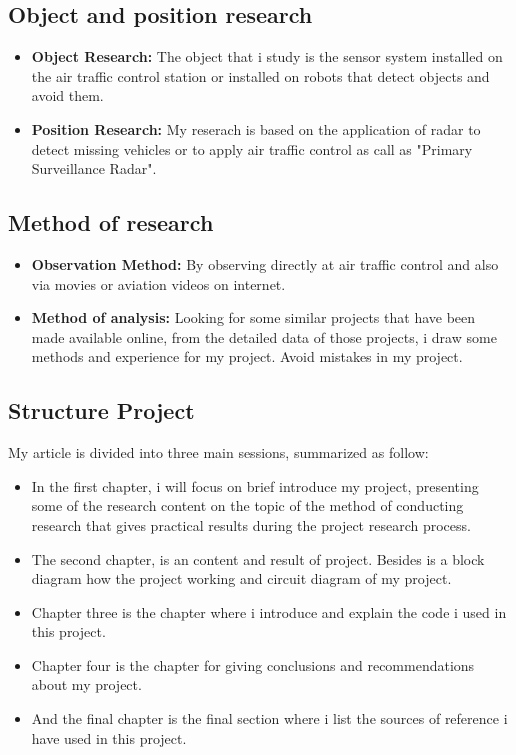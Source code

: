 \documentclass[a4paper,13pt]{report}
\begin{document}
    \subsection{Object and position research}
    \vspace{3mm}
        \begin{itemize}
            \item \textbf{Object Research:} The object that i study is the sensor system 
        installed on the air traffic control station or installed on robots that detect 
        objects and avoid them.
            \item \textbf{Position Research:} My reserach is based on the application of radar 
        to detect missing vehicles or to apply air traffic control as call as "Primary Surveillance Radar".
        \end{itemize} 
    \subsection{Method of research}
        \begin{itemize}
            \item \textbf{Observation Method:} By observing directly at air traffic control 
        and also via movies or aviation videos on internet.
            \item \textbf{Method of analysis:} Looking for some similar projects that have 
        been made available online, from the detailed data of those projects, i draw some 
        methods and experience for my project. Avoid mistakes in my project.
        \end{itemize}
    \subsection{Structure Project}
        My article is divided into three main sessions, summarized as follow: 
        \begin{itemize}
            \item In the first chapter, i will focus on brief introduce my project, presenting 
        some of the research content on the topic of the method of conducting research that 
        gives practical results during the project research process.
            \item The second chapter, is an content and result of project. Besides is a block diagram 
        how the project working and circuit diagram of my project.
            \item Chapter three is the chapter where i introduce and explain the code i used in this project.
            \item Chapter four is the chapter for giving conclusions and recommendations about my project.
            \item And the final chapter is the final section where i list the sources of reference i have 
        used in this project.
        \end{itemize}
    \newpage
\end{document}
